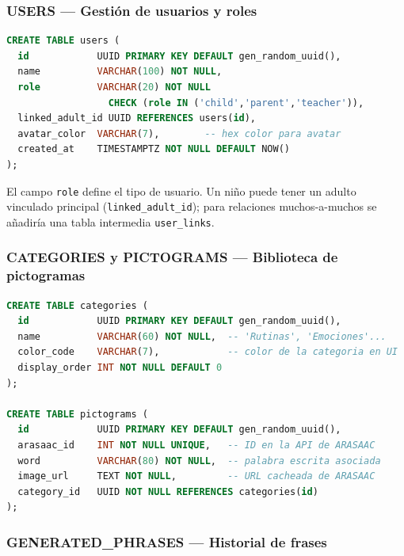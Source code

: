 \documentclass[12pt, a4paper]{article}
\begin{document}
\subsubsection{USERS --- Gestión de usuarios y roles}

\begin{cajatecnica}
\begin{lstlisting}[language=SQL]
CREATE TABLE users (
  id            UUID PRIMARY KEY DEFAULT gen_random_uuid(),
  name          VARCHAR(100) NOT NULL,
  role          VARCHAR(20) NOT NULL
                  CHECK (role IN ('child','parent','teacher')),
  linked_adult_id UUID REFERENCES users(id),
  avatar_color  VARCHAR(7),        -- hex color para avatar
  created_at    TIMESTAMPTZ NOT NULL DEFAULT NOW()
);
\end{lstlisting}
\end{cajatecnica}

El campo \texttt{role} define el tipo de usuario. Un niño puede tener un adulto vinculado principal (\texttt{linked\_adult\_id}); para relaciones muchos-a-muchos se añadiría una tabla intermedia \texttt{user\_links}.

\subsubsection{CATEGORIES y PICTOGRAMS --- Biblioteca de pictogramas}

\begin{cajatecnica}
\begin{lstlisting}[language=SQL]
CREATE TABLE categories (
  id            UUID PRIMARY KEY DEFAULT gen_random_uuid(),
  name          VARCHAR(60) NOT NULL,  -- 'Rutinas', 'Emociones'...
  color_code    VARCHAR(7),            -- color de la categoria en UI
  display_order INT NOT NULL DEFAULT 0
);

CREATE TABLE pictograms (
  id            UUID PRIMARY KEY DEFAULT gen_random_uuid(),
  arasaac_id    INT NOT NULL UNIQUE,   -- ID en la API de ARASAAC
  word          VARCHAR(80) NOT NULL,  -- palabra escrita asociada
  image_url     TEXT NOT NULL,         -- URL cacheada de ARASAAC
  category_id   UUID NOT NULL REFERENCES categories(id)
);
\end{lstlisting}
\end{cajatecnica}

\subsubsection{GENERATED\_PHRASES --- Historial de frases}
\end{document}
